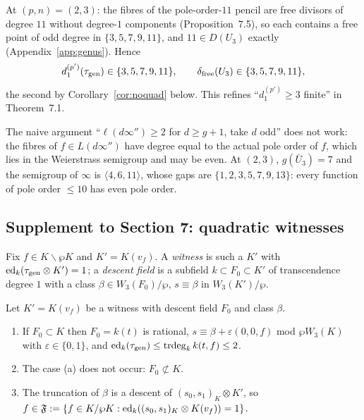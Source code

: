 \begin{corollary}\label{cor:B23}
At $(p,n)=(2,3)$: the fibres of the pole-order-$11$ pencil are free divisors of degree
$11$ without degree-$1$ components (Proposition~7.5), so each contains a free point of
odd degree in $\{3,5,7,9,11\}$, and $11\in D(U_3)$ exactly (Appendix~\ref{app:genus}).
Hence
\[
d_1^{(p')}(\tau_{\mathrm{gen}})\in\{3,5,7,9,11\},\qquad \delta_{\rm free}(U_3)\in\{3,5,7,9,11\},
\]
the second by Corollary~\ref{cor:noquad} below. This refines ``$d_1^{(p')}\ge3$ finite''
in Theorem~7.1. 
\end{corollary}

\begin{remark}
The naive argument ``$\ell(d\infty'')\ge2$ for $d\ge g+1$, take $d$ odd'' does not
work: the fibres of $f\in L(d\infty'')$ have degree equal to the actual pole order of
$f$, which lies in the Weierstrass semigroup and may be even. At $(2,3)$, $g(\bar U_3)=7$
and the semigroup of $\infty$ is $\langle4,6,11\rangle$, whose gaps are
$\{1,2,3,5,7,9,13\}$: every function of pole order $\le10$ has even pole order.
\end{remark}

\subsection{Supplement to Section 7: quadratic witnesses}

Fix $f\in K\smallsetminus\wp K$ and $K'=K(v_f)$. A \emph{witness} is such a $K'$ with
$\operatorname{ed}_k(\tau_{\mathrm{gen}}\otimes K')=1$; a \emph{descent field} is a subfield $k\subset F_0\subset
K'$ of transcendence degree $1$ with a class $\beta\in W_3(F_0)/\wp$, $s\equiv\beta$ in
$W_3(K')/\wp$.

\begin{theorem}\label{thm:caseA}
Let $K'=K(v_f)$ be a witness with descent field $F_0$ and class $\beta$.
\begin{enumerate}
\item[(a)] If $F_0\subset K$ then $F_0=k(t)$ is rational, $s\equiv\beta+\varepsilon(0,0,f)$
mod $\wp W_3(K)$ with $\varepsilon\in\{0,1\}$, and $\operatorname{ed}_k(\tau_{\mathrm{gen}})\le\operatorname{trdeg}_kk(t,f)\le2$.
\item[(b)] The case (a) does not occur: $F_0\not\subset K$.
\item[(c)] The truncation of $\beta$ is a descent of $(s_0,s_1)_K\otimes K'$, so
$f\in\mathfrak F:=\{f\in K/\wp K:\operatorname{ed}_k((s_0,s_1)_K\otimes K(v_f))=1\}$.
\end{enumerate}
\end{theorem}

